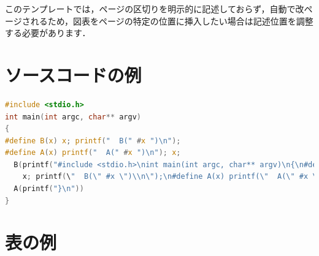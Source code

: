 \documentclass[fontsize=9bp,twocolumn,column_gap=2.36zw,a4paper,report]{jlreq}
\begin{document}
このテンプレートでは，ページの区切りを明示的に記述しておらず，自動で改ページされるため，図表をページの特定の位置に挿入したい場合は記述位置を調整する必要があります．

\begin{figure}[h]
\end{figure}

\section{ソースコードの例}

\begin{lstlisting}[caption=C言語の記述例,label=code:polyglot,language=c]
#include <stdio.h>
int main(int argc, char** argv)
{
#define B(x) x; printf("  B(" #x ")\n");
#define A(x) printf("  A(" #x ")\n"); x;
  B(printf("#include <stdio.h>\nint main(int argc, char** argv)\n{\n#define B(x) 
    x; printf(\"  B(\" #x \")\\n\");\n#define A(x) printf(\"  A(\" #x \")\\n\"); x;\n"))
  A(printf("}\n"))
}
\end{lstlisting}

\section{表の例}
\end{document}
